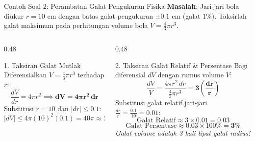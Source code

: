 \documentclass[aspectratio=169,10pt]{beamer}
\begin{document}
\begin{frame}{Contoh Soal 2: Perambatan Galat Pengukuran Fisika}
    \textbf{Masalah}: Jari-jari bola diukur $r = 10\text{ cm}$ dengan batas galat pengukuran $\pm 0.1\text{ cm}$ (galat $1\%$). Taksirlah galat maksimum pada perhitungan volume bola $V = \frac{4}{3}\pi r^3$.

    \vspace{0.1cm}
    \pause
    \begin{columns}[T]
        \begin{column}{0.48\textwidth}
            \begin{block}{1. Taksiran Galat Mutlak}
                Diferensialkan $V = \frac{4}{3}\pi r^3$ terhadap $r$:
                \[
                    \frac{dV}{dr} = 4\pi r^2 \implies \mathbf{dV = 4\pi r^2\,dr}
                \]
                Substitusi $r = 10$ dan $|dr| \le 0.1$:
                \[
                    |dV| \le 4\pi (10)^2 (0.1) = 40\pi \approx \mathbf{125.66\text{ cm}^3}
                \]
            \end{block}
        \end{column}

        \begin{column}{0.48\textwidth}
            \begin{exampleblock}{2. Taksiran Galat Relatif \& Persentase}
                Bagi diferensial $dV$ dengan rumus volume $V$:
                \[
                    \frac{dV}{V} = \frac{4\pi r^2\,dr}{\frac{4}{3}\pi r^3} = \mathbf{3 \left(\frac{dr}{r}\right)}
                \]
                Substitusi galat relatif jari-jari $\frac{dr}{r} = \frac{0.1}{10} = 0.01$:
                \[
                    \text{Galat Relatif} \approx 3 \times 0.01 = \mathbf{0.03}
                \]
                \[
                    \text{Galat Persentase} \approx 0.03 \times 100\% = \mathbf{3\%}
                \]
                {\scriptsize \textit{Galat volume adalah 3 kali lipat galat radius!}}
            \end{exampleblock}
        \end{column}
    \end{columns}
\end{frame}
\end{document}
